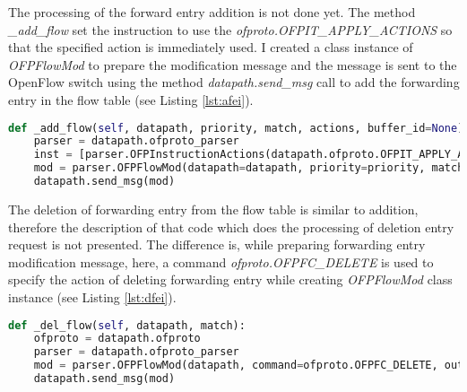 The processing of the forward entry addition is not done yet. The method \textit{\_add\_flow} set the instruction to use the \textit{ofproto.OFPIT\_APPLY\_ACTIONS} so that the specified action is immediately used. I created a class instance of \textit{OFPFlowMod} to prepare the modification message and the message is sent to the OpenFlow switch using the method \textit{datapath.send\_msg} call to add the forwarding entry in the flow table (see Listing \ref{lst:afei}).
\begin{lstlisting}[caption={Add forwarding entry implementation},label={lst:afei},language=Python,tabsize=2,basicstyle=\footnotesize,breaklines=true, showspaces=false,showstringspaces=false,showtabs=false,frame=single]
def _add_flow(self, datapath, priority, match, actions, buffer_id=None):
	parser = datapath.ofproto_parser
	inst = [parser.OFPInstructionActions(datapath.ofproto.OFPIT_APPLY_ACTIONS, actions)]
	mod = parser.OFPFlowMod(datapath=datapath, priority=priority, match=match, instructions=inst)
	datapath.send_msg(mod)
\end{lstlisting}
The deletion of forwarding entry from the flow table is similar to addition, therefore the description of that code which does the processing of deletion entry request is not presented. The difference is, while preparing forwarding entry modification message, here, a command \textit{ofproto.OFPFC\_DELETE} is used to specify the action of deleting forwarding entry while creating \textit{OFPFlowMod} class instance (see Listing \ref{lst:dfei}).
\begin{lstlisting}[caption={Delete forwarding entry implementation},label={lst:dfei},language=Python,tabsize=2,basicstyle=\footnotesize,breaklines=true, showspaces=false,showstringspaces=false,showtabs=false,frame=single]
def _del_flow(self, datapath, match):
	ofproto = datapath.ofproto
	parser = datapath.ofproto_parser
	mod = parser.OFPFlowMod(datapath, command=ofproto.OFPFC_DELETE, out_port=ofproto.OFPP_ANY, out_group=ofproto.OFPG_ANY,priority=1, match=match)
	datapath.send_msg(mod)
\end{lstlisting}

